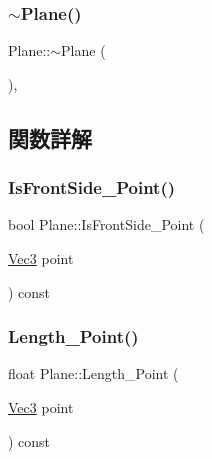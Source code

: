 \mbox{\label{class_plane_a69abd86051c880dcb44b249ad10c4436}} 
\subsubsection{\texorpdfstring{$\sim$\+Plane()}{~Plane()}}
{\footnotesize\ttfamily Plane\+::$\sim$\+Plane (\begin{DoxyParamCaption}{ }\end{DoxyParamCaption})\hspace{0.3cm}{\ttfamily [inline]}, {\ttfamily [virtual]}}



\subsection{関数詳解}
\mbox{\label{class_plane_afb752b43ee18e5e99f2682595d35fd87}} 
\subsubsection{\texorpdfstring{Is\+Front\+Side\+\_\+\+Point()}{IsFrontSide\_Point()}}
{\footnotesize\ttfamily bool Plane\+::\+Is\+Front\+Side\+\_\+\+Point (\begin{DoxyParamCaption}\item[{\mbox{\hyperlink{_vector3_d_8h_ab16f59e4393f29a01ec8b9bbbabbe65d}{Vec3}}}]{point }\end{DoxyParamCaption}) const\hspace{0.3cm}{\ttfamily [inline]}}

\mbox{\label{class_plane_af0315d2a7aebf6057410799f127b6c17}} 
\subsubsection{\texorpdfstring{Length\+\_\+\+Point()}{Length\_Point()}}
{\footnotesize\ttfamily float Plane\+::\+Length\+\_\+\+Point (\begin{DoxyParamCaption}\item[{\mbox{\hyperlink{_vector3_d_8h_ab16f59e4393f29a01ec8b9bbbabbe65d}{Vec3}}}]{point }\end{DoxyParamCaption}) const\hspace{0.3cm}{\ttfamily [inline]}}



